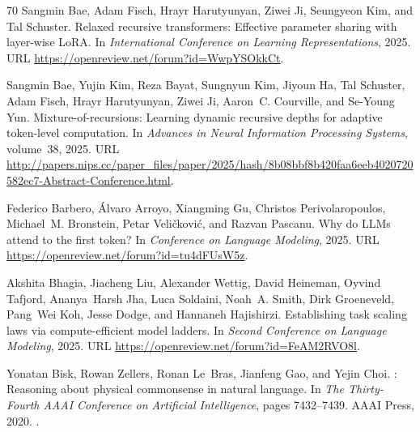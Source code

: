\documentclass[]{bytedance_seed}
\theoremstyle{definition}
\theoremstyle{remark}
\begin{document}
\begin{thebibliography}{70}
Sangmin Bae, Adam Fisch, Hrayr Harutyunyan, Ziwei Ji, Seungyeon Kim, and Tal
  Schuster.
\newblock Relaxed recursive transformers: Effective parameter sharing with
  layer-wise {LoRA}.
\newblock In \emph{International Conference on Learning Representations},
  2025{}.
\newblock URL \url{https://openreview.net/forum?id=WwpYSOkkCt}.

Sangmin Bae, Yujin Kim, Reza Bayat, Sungnyun Kim, Jiyoun Ha, Tal Schuster, Adam
  Fisch, Hrayr Harutyunyan, Ziwei Ji, Aaron~C. Courville, and Se-Young Yun.
\newblock Mixture-of-recursions: Learning dynamic recursive depths for adaptive
  token-level computation.
\newblock In \emph{Advances in Neural Information Processing Systems},
  volume~38, 2025{}.
\newblock URL
  \url{http://papers.nips.cc/paper_files/paper/2025/hash/8b08bbf8b420faa6eeb4020720582ec7-Abstract-Conference.html}.

Federico Barbero, {\'A}lvaro Arroyo, Xiangming Gu, Christos Perivolaropoulos,
  Michael~M. Bronstein, Petar Veli{\v{c}}kovi{\'c}, and Razvan Pascanu.
\newblock Why do {LLMs} attend to the first token?
\newblock In \emph{Conference on Language Modeling}, 2025.
\newblock URL \url{https://openreview.net/forum?id=tu4dFUsW5z}.

Akshita Bhagia, Jiacheng Liu, Alexander Wettig, David Heineman, Oyvind Tafjord,
  Ananya~Harsh Jha, Luca Soldaini, Noah~A. Smith, Dirk Groeneveld, Pang~Wei
  Koh, Jesse Dodge, and Hannaneh Hajishirzi.
\newblock Establishing task scaling laws via compute-efficient model ladders.
\newblock In \emph{Second Conference on Language Modeling}, 2025.
\newblock URL \url{https://openreview.net/forum?id=FeAM2RVO8l}.

Yonatan Bisk, Rowan Zellers, Ronan Le~Bras, Jianfeng Gao, and Yejin Choi.
: Reasoning about physical commonsense in natural language.
\newblock In \emph{The Thirty-Fourth AAAI Conference on Artificial
  Intelligence}, pages 7432--7439. {AAAI} Press, 2020.
\newblock {}.


\end{thebibliography}
\end{document}
